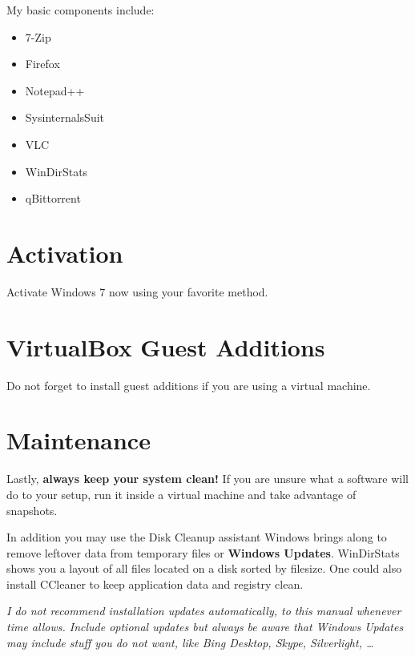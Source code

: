 \documentclass{itsarticle}
\begin{document}

My basic components include:

\begin{itemize}
    \item 7-Zip
    \item Firefox
    \item Notepad++
    \item SysinternalsSuit
    \item VLC
    \item WinDirStats
    \item qBittorrent
\end{itemize}

\section{Activation}
\label{sec:activation}

Activate Windows 7 now using your favorite method.

\section{VirtualBox Guest Additions}
\label{sec:guest_additions}

Do not forget to install guest additions if you are using a virtual machine.

\section{Maintenance}
\label{sec:maintenance}

Lastly, \textbf{always keep your system clean!} If you are unsure what a
software will do to your setup, run it inside a virtual machine and take
advantage of snapshots.

In addition you may use the Disk Cleanup assistant Windows brings along to
remove leftover data from temporary files or \textbf{Windows Updates}.
WinDirStats shows you a layout of all files located on a disk sorted by
filesize. One could also install CCleaner to keep application data and registry
clean.

\textit{I do not recommend installation updates automatically, to this manual
whenever time allows. Include optional updates but always be aware that Windows
Updates may include stuff you do not want, like Bing Desktop, Skype,
Silverlight, \ldots}
\end{document}
